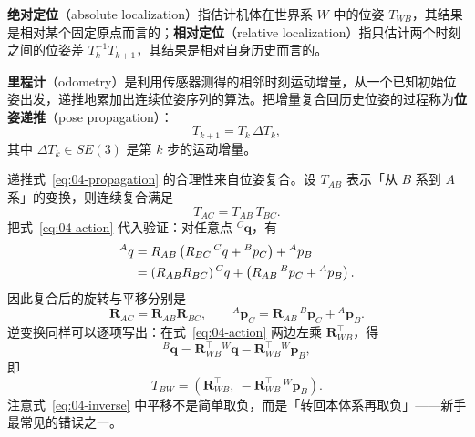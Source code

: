 \begin{definition}[绝对定位与相对定位]
\textbf{绝对定位}（absolute localization）指估计机体在世界系 $W$ 中的位姿 $T_{WB}$，其结果是相对某个固定原点而言的；\textbf{相对定位}（relative localization）指只估计两个时刻之间的位姿差 $T_{k}^{-1}T_{k+1}$，其结果是相对自身历史而言的。
\end{definition}

\begin{definition}[里程计与位姿递推]
\textbf{里程计}（odometry）是利用传感器测得的相邻时刻运动增量，从一个已知初始位姿出发，递推地累加出连续位姿序列的算法。把增量复合回历史位姿的过程称为\textbf{位姿递推}（pose propagation）：
\begin{equation}
  T_{k+1} = T_{k}\,\Delta T_{k},
  \label{eq:04-propagation}
\end{equation}
其中 $\Delta T_{k}\in SE(3)$ 是第 $k$ 步的运动增量。
\end{definition}

递推式~\eqref{eq:04-propagation} 的合理性来自位姿复合。设 $T_{AB}$ 表示「从 $B$ 系到 $A$ 系」的变换，则连续复合满足
\begin{equation}
  T_{AC} = T_{AB}\,T_{BC}.
  \label{eq:04-compose}
\end{equation}
把式~\eqref{eq:04-action} 代入验证：对任意点 ${}^{C}\bm{q}$，有
\begin{align}
  {}^{A}q
  &= R_{AB}\left(R_{BC}\,{}^{C}q + {}^{B}p_{C}\right) + {}^{A}p_{B} \notag\\
  &= \left(R_{AB}R_{BC}\right){}^{C}q
     + \left(R_{AB}\,{}^{B}p_{C} + {}^{A}p_{B}\right).
  \label{eq:04-compose-proof}
\end{align}
因此复合后的旋转与平移分别是
\begin{equation}
  \bm{R}_{AC} = \bm{R}_{AB}\bm{R}_{BC},
  \qquad
  {}^{A}\bm{p}_{C} = \bm{R}_{AB}\,{}^{B}\bm{p}_{C} + {}^{A}\bm{p}_{B}.
\end{equation}
逆变换同样可以逐项写出：在式~\eqref{eq:04-action} 两边左乘 $\bm{R}_{WB}^{\top}$，得
\begin{equation}
  {}^{B}\bm{q} = \bm{R}_{WB}^{\top}{}^{W}\bm{q} - \bm{R}_{WB}^{\top}{}^{W}\bm{p}_{B},
\end{equation}
即
\begin{equation}
  T_{BW} = \left(\bm{R}_{WB}^{\top},\ -\bm{R}_{WB}^{\top}\,{}^{W}\bm{p}_{B}\right).
  \label{eq:04-inverse}
\end{equation}
注意式~\eqref{eq:04-inverse} 中平移不是简单取负，而是「转回本体系再取负」——新手最常见的错误之一。

